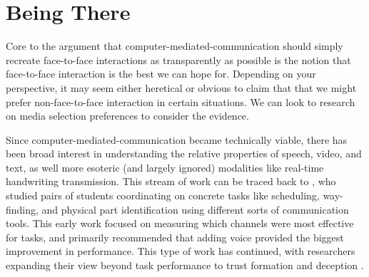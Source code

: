 
\section{Being There}
Core to the argument that computer-mediated-communication should simply recreate face-to-face interactions as transparently as possible is the notion that face-to-face interaction is the best we can hope for. Depending on your perspective, it may seem either heretical or obvious to claim that that we might prefer non-face-to-face interaction in certain situations. We can look to research on media selection preferences to consider the evidence.

Since computer-mediated-communication became technically viable, there has been broad interest in understanding the relative properties of speech, video, and text, as well more esoteric (and largely ignored) modalities like real-time handwriting transmission. \citep{Williams:1977p682} This stream of work can be traced back to \citet{Ochsman:1974vu}, who studied pairs of students coordinating on concrete tasks like scheduling, way-finding, and physical part identification using different sorts of communication tools. This early work focused on measuring which channels were most effective for tasks, and primarily recommended that adding voice provided the biggest improvement in performance. This type of work has continued, with researchers expanding their view beyond task performance to trust formation \citep{Bos:2002p256}\citep{Toma:2010p347} and deception \citep{Hancock:2004p314}.


